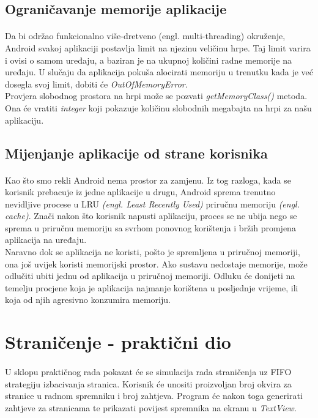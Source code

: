 \documentclass[times, utf8, zavrsni]{fer}
\begin{document}
\subsection{Ograničavanje memorije aplikacije}
\paragraph{}
Da bi održao funkcionalno više-dretveno (engl. multi-threading) okruženje, Android svakoj aplikaciji postavlja limit na njezinu veličinu hrpe. Taj limit varira i ovisi o samom uređaju, a baziran je na ukupnoj količini radne memorije na uređaju. U slučaju da aplikacija pokuša alocirati memoriju u trenutku kada je već dosegla svoj limit, dobiti će \textit{OutOfMemoryError}.\\

Provjera slobodnog prostora na hrpi može se pozvati \textit{getMemoryClass()} metoda. Ona će vratiti \textit{integer} koji pokazuje količinu slobodnih megabajta na hrpi za našu aplikaciju.

\subsection{Mijenjanje aplikacije od strane korisnika}
\paragraph{}
Kao što smo rekli Android nema prostor za zamjenu. Iz tog razloga, kada se korisnik prebacuje iz jedne aplikacije u drugu, Android sprema trenutno nevidljive procese u LRU \textit{(engl. Least Recently Used)} priručnu memoriju \textit{(engl. cache)}. Znači nakon što korisnik napusti aplikaciju, proces se ne ubija nego se sprema u priručnu memoriju sa svrhom ponovnog korištenja i bržih promjena aplikacija na uređaju.\\

Naravno dok se aplikacija ne koristi, pošto je spremljena u priručnoj memoriji, ona još uvijek koristi memorijski prostor. Ako sustavu nedostaje memorije, može odlučiti ubiti jednu od aplikacija u priručnoj memoriji. Odluku će donijeti na temelju procjene koja je aplikacija najmanje korištena u posljednje vrijeme, ili  koja od njih agresivno konzumira memoriju.

\section{Straničenje - praktični dio}
\paragraph{}
U sklopu praktičnog rada pokazat će se simulacija rada straničenja uz FIFO strategiju izbacivanja stranica. Korisnik će unositi proizvoljan broj okvira za stranice u radnom spremniku i broj zahtjeva. Program će nakon toga generirati zahtjeve za stranicama te prikazati povijest spremnika na ekranu u \textit{TextView}.\newpage
\end{document}

